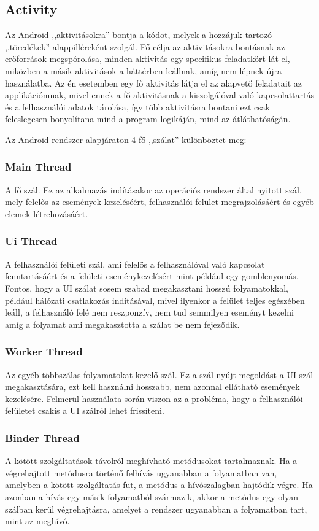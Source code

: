 \documentclass[
]{thesis-ekf}
\theoremstyle{definition}
\theoremstyle{remark}
\begin{document}
\subsection{Activity}
Az Android ,,aktivitásokra'' bontja a kódot, melyek a hozzájuk tartozó ,,töredékek'' alappilléreként szolgál.
Fő célja az aktivitásokra bontásnak az erőforrások megspórolása, minden aktivitás egy specifikus feladatkört lát el, 
miközben a másik aktivitások a háttérben leállnak, amíg nem lépnek újra használatba. Az én esetemben egy fő aktivitás
látja el az alapvető feladatait az applikációmnak, mivel ennek a fő aktivitásnak a kiszolgálóval való kapcsolattartás és
a felhasználói adatok tárolása, így több aktivitásra bontani ezt csak feleslegesen bonyolítana mind a program logikáján,
mind az átláthatóságán.

Az Android rendszer alapjáraton 4 fő ,,szálat'' különböztet meg:
\subsubsection{Main Thread}
A fő szál. Ez az alkalmazás indításakor az operációs rendszer által nyitott szál, mely felelős az események kezeléséért, felhasználói felület megrajzolásáért és egyéb elemek létrehozásáért.
	
\subsubsection{Ui Thread}
A felhasználói felületi szál, ami felelős a felhasználóval való kapcsolat fenntartásáért 
és a felületi eseménykezelésért mint például egy gomblenyomás. Fontos, 
hogy a UI szálat sosem szabad megakasztani hosszú folyamatokkal, 
például hálózati csatlakozás indításával, mivel ilyenkor a felület teljes egészében leáll, 
a felhasználó felé nem reszponzív, nem tud semmilyen eseményt kezelni 
amíg a folyamat ami megakasztotta a szálat be nem fejeződik.
	
\subsubsection{Worker Thread}
Az egyéb többszálas folyamatokat kezelő szál. Ez a szál nyújt megoldást a UI szál megakasztására,
ezt kell használni hosszabb, nem azonnal ellátható események kezelésére. Felmerül használata során viszon az a
probléma, hogy a felhasználói felületet csakis a UI szálról lehet frissíteni. 
	
\subsubsection{Binder Thread}
A kötött szolgáltatások távolról meghívható metódusokat tartalmaznak. Ha a végrehajtott metódusra történő felhívás ugyanabban a folyamatban van, amelyben a kötött szolgáltatás fut, a metódus a hívószalagban hajtódik végre. Ha azonban a hívás egy másik folyamatból származik, akkor a metódus egy olyan szálban kerül végrehajtásra, amelyet a rendszer ugyanabban a folyamatban tart, mint az meghívó.
\end{document}
